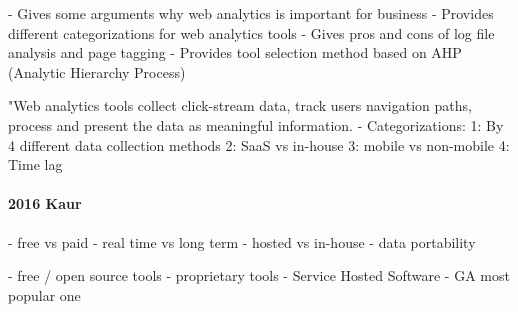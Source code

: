 - Gives some arguments why web analytics is important for business
- Provides different categorizations for web analytics tools
- Gives pros and cons of log file analysis and page tagging
- Provides tool selection method based on AHP (Analytic Hierarchy Process)

"Web analytics tools collect click-stream data, track users navigation paths, process and present the data as meaningful information.
- Categorizations:
1: By 4 different data collection methods
2: SaaS vs in-house
3: mobile vs non-mobile
4: Time lag












\paragraph{2016 Kaur}







- free vs paid
- real time vs long term
- hosted vs in-house
- data portability









- free / open source tools
- proprietary tools
- Service Hosted Software
- GA most popular one






